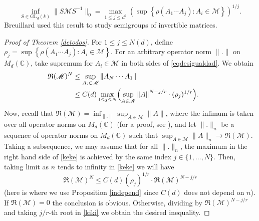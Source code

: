 \documentclass[JEP,XML,SOM,Unicode,NoEqCountersInSection]{cedram}
\let\mathcal\mathscr
\theoremstyle{plain}
\theoremstyle{definition}
\newcommand{\CC}{\mathbb{C}}
\newcommand{\corchete}[1]{\left\{{#1}\right\}}
\begin{document}
\begin{equation*}
\inf_{S\in \mathrm{GL}_d(k)}{\|S\mathcal{M}S^{-1}\|_0}=\max_{1\leq j\leq d^2}{\left(\sup\corchete{\rho(A_{1}\cdots A_{j}) : A_{i}\in \mathcal{M}}\right)^{1/j}}.
\end{equation*}
Breuillard used this result to study semigroups of invertible matrices.
\begin{proof}[Proof of Theorem \ref{detodos}]
For $1\leq j\leq N(d)$, define $\rho_{j}=\sup\corchete{\rho(A_{1}\cdots A_{j}) : A_{i}\in \mathcal{M}}$. For an arbitrary operator norm $\|.\|$ on $M_{d}(\CC)$, take supremum for $A_{i}\in \mathcal{M}$ in both sides of \eqref{eqdesigualdad}. We obtain
\begin{alignat}{2}
\mathfrak{R}(\mathcal{M})^{N} & \leq\sup_{A_{i}\in \mathcal{M}}{\|A_{N}\cdots A_{1}\|} \notag\\
& \leq C(d) \max_{1\leq j\leq N}\Bigl(\sup_{A\in \mathcal{M}}{\|A\|}^{N-j/r}\cdot (\rho_{j})^{1/r}\Bigr). &\quad \label{keke}
\end{alignat}
Now, recall that $\mathfrak{R}(\mathcal{M})=\inf_{\|.\|}{\sup_{A\in \mathcal{M}}{\|A\|}}$, where the infimum is taken over all operator norms on $M_{d}(\CC)$ (for a proof, see \cite{rota}), and let $\|.\|_{n}$ be a sequence of operator norms on $M_{d}(\CC)$ such that $\sup_{A\in \mathcal{M}}{\|A\|_{n}}\to \mathfrak{R}(\mathcal{M})$. Taking a subsequence, we may assume that for all $\|.\|_{n}$, the maximum in the right hand side of \eqref{keke} is achieved by the same index $j\in \{1,\dots, N \}$. Then, taking limit as $n$ tends to infinity in \eqref{keke} we will have
\begin{equation}\label{kiki}
\mathfrak{R}(\mathcal{M})^{N}\leq C(d)(\rho_{j})^{1/r}\cdot\mathfrak{R}(\mathcal{M})^{N-j/r }
\end{equation}
(here is where we use Proposition \ref{independ} since $C(d)$ does not depend on $n$). If $\mathfrak{R}(\mathcal{M})=0$ the conclusion is obvious. Otherwise, dividing by $\mathfrak{R}(\mathcal{M})^{N-j/r}$ and taking $j/r$-th root in \eqref{kiki} we obtain the desired inequality.
\end{proof}
\end{document}
